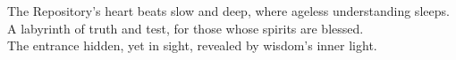 \documentclass{article}
\begin{document}
\begin{infobox}
The Repository's heart beats slow and deep, where ageless understanding sleeps.\\
A labyrinth of truth and test, for those whose spirits are blessed.\\
The entrance hidden, yet in sight, revealed by wisdom's inner light.
\end{infobox}
\end{document}
